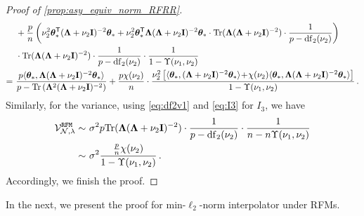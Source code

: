 \begin{proof}[Proof of \cref{prop:asy_equiv_norm_RFRR}]
\[\begin{aligned}
    &~+ \frac{p}{n} \left(\nu_2^2 {\boldsymbol \theta}_*^{\mathsf T} ({\boldsymbol \Lambda} + \nu_2{\mathbf I})^{-2} {\boldsymbol \theta}_* + \nu_2^2 {\boldsymbol \theta}_*^{\mathsf T} {\boldsymbol \Lambda} ({\boldsymbol \Lambda} + \nu_2{\mathbf I})^{-2} {\boldsymbol \theta}_* \cdot {\rm Tr}( {\boldsymbol \Lambda} ({\boldsymbol \Lambda} + \nu_2{\mathbf I})^{-2} ) \cdot \frac{1}{p - {\rm df}_2(\nu_2)} \right)\\
    &~\cdot {\rm Tr}({\boldsymbol \Lambda}({\boldsymbol \Lambda} + \nu_2{\mathbf I})^{-2}) \cdot \frac{1}{p - {\rm df}_2(\nu_2)} \cdot \frac{1}{1 - \Upsilon(\nu_1, \nu_2)}\\
    =&~\frac{p\langle {\boldsymbol \theta}_*, {\boldsymbol \Lambda} ( {\boldsymbol \Lambda} + \nu_2{\mathbf I})^{-2} {\boldsymbol \theta}_* \rangle}{p - {\rm Tr}\left({\boldsymbol \Lambda}^2 ({\boldsymbol \Lambda} + \nu_2{\mathbf I})^{-2}\right)} + \frac{p\chi(\nu_2)}{n} \cdot \frac{\nu_2^2\left[ \langle {\boldsymbol \theta}_*, ({\boldsymbol \Lambda} + \nu_2{\mathbf I})^{-2} {\boldsymbol \theta}_* \rangle \!+\! \chi(\nu_2) \langle {\boldsymbol \theta}_*, {\boldsymbol \Lambda} ({\boldsymbol \Lambda} + \nu_2{\mathbf I})^{-2} {\boldsymbol \theta}_* \rangle \right]}{1 - \Upsilon(\nu_1, \nu_2)}\,.
\end{aligned}
\]
Similarly, for the variance, using \cref{eq:df2v1} and \cref{eq:I3} for $I_3$, we have
\[
\begin{aligned}
    \mathcal{V}_{\mathcal{N},\lambda}^{\tt RFM} \sim&~ \sigma^2 p {\rm Tr}({\boldsymbol \Lambda}({\boldsymbol \Lambda} + \nu_2{\mathbf I})^{-2}) \cdot \frac{1}{p - {\rm df}_2(\nu_2)}\cdot \frac{1}{n-n\Upsilon(\nu_1,\nu_2)}\\
    \sim&~ \sigma^2 \frac{\frac{p}{n}\chi(\nu_2)}{1-\Upsilon(\nu_1, \nu_2)}\,.
\end{aligned}
\]
Accordingly, we finish the proof.
\end{proof}

In the next, we present the proof for min-$\ell_2$-norm interpolator under RFMs.

